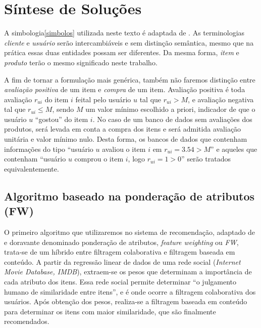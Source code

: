 \chapter[Síntese de Soluções]{Síntese de Soluções}
\label{chap:sintese_de_solucoes}

A simbologia\ref{simbolos} utilizada neste texto é adaptada de \cite{symeonidis2007feature}. As terminologias \textit{cliente} e \textit{usuário} serão intercambiáveis e sem distinção semântica, mesmo que na prática essas duas entidades possam ser diferentes. Da mesma forma, \textit{item} e \textit{produto} terão o mesmo significado neste trabalho. 

A fim de tornar a formulação mais genérica, também não faremos distinção entre \textit{avaliação positiva} de um item e \textit{compra} de um item. Avaliação positiva é toda avaliação $r_{ui}$ do item $i$ feital pelo usuário $u$ tal que $r_{ui} > M$, e avaliação negativa tal que $r_{ui} \leq M$, sendo $M$ um valor mínimo escolhido a priori, indicador de que o usuário $u$ ``gostou'' do item $i$. No caso de um banco de dados sem avaliações dos produtos, será levada em conta a compra dos itens e será admitida avaliação unitária e valor mínimo nulo. Desta forma, os bancos de dados que contenham informações do tipo ``usuário $u$ avaliou o item $i$ em $r_{ui} = 3.54 > M$'' e aqueles que contenham ``usuário $u$ comprou o item $i$, logo $r_{ui} = 1 > 0$'' serão tratados equivalentemente.

\section{Algoritmo baseado na ponderação de atributos (FW)} %
\label{sec:algoritmo_baseado_na_pondera_o_de_atributos_}


O primeiro algoritmo que utilizaremos no sistema de recomendação, adaptado de  \cite{symeonidis2007feature} e doravante denominado ponderação de atributos, \textit{feature weighting} ou \textit{FW}, trata-se de um híbrido entre filtragem colaborativa e filtragem baseada em conteúdo. A partir da regressão linear de dados de uma rede social (\textit{Internet Movie Database, IMDB}), extraem-se os pesos que determinam a importância de cada atributo dos itens. Essa rede social permite determinar ``o julgamento humano de similaridade entre itens'', e é onde ocorre a filtragem colaborativa dos usuários. Após obtenção dos pesos, realiza-se a filtragem baseada em conteúdo para determinar os itens com maior similaridade, que são finalmente recomendados.

